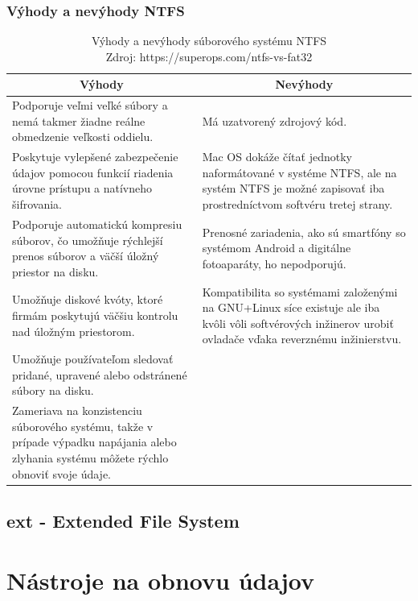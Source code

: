 \documentclass[12pt,oneside,slovak,a4paper]{article}
\begin{document}
\subsubsection{Výhody a nevýhody NTFS}
\begin{table}[H]
\begin{tabularx}{\linewidth}{|X|X|}
\hline
\multicolumn{1}{|c|}{\textbf{Výhody}} & \multicolumn{1}{c|}{\textbf{Nevýhody}} \\ \hline
Podporuje veľmi veľké súbory a nemá takmer žiadne reálne obmedzenie veľkosti oddielu. & Má uzatvorený zdrojový kód. \\ \hline
Poskytuje vylepšené zabezpečenie údajov pomocou funkcií riadenia úrovne prístupu a natívneho šifrovania. & Mac OS dokáže čítať jednotky naformátované v systéme NTFS, ale na systém NTFS je možné zapisovať iba prostredníctvom softvéru tretej strany. \\ \hline
Podporuje automatickú kompresiu súborov, čo umožňuje rýchlejší prenos súborov a väčší úložný priestor na disku. & Prenosné zariadenia, ako sú smartfóny so systémom Android a digitálne fotoaparáty, ho nepodporujú. \\ \hline
Umožňuje diskové kvóty, ktoré firmám poskytujú väčšiu kontrolu nad úložným priestorom. & Kompatibilita so systémami založenými na GNU+Linux síce existuje ale iba kvôli vôli softvérových inžinerov urobiť ovladače vďaka reverznému inžinierstvu. \\ \hline
Umožňuje používateľom sledovať pridané, upravené alebo odstránené súbory na disku. &  \\ \hline
Zameriava na konzistenciu súborového systému, takže v prípade výpadku napájania alebo zlyhania systému môžete rýchlo obnoviť svoje údaje. &  \\ \hline
\end{tabularx}
\centering
\captionsetup{justification=centering,margin=2cm}
\caption{Výhody a nevýhody súborového systému NTFS \\ Zdroj: https://superops.com/ntfs-vs-fat32}
\end{table}



\subsection{ext - Extended File System}

\section{Nástroje na obnovu údajov}
\end{document}
